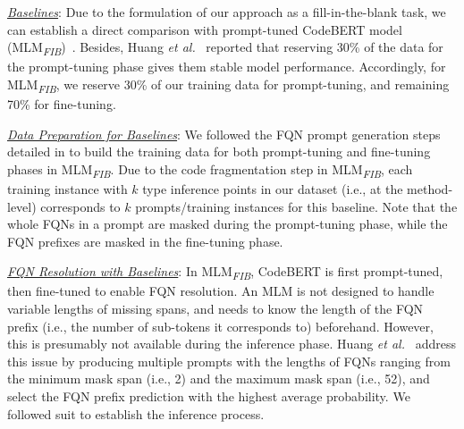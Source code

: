 
\noindent\underline{\textit{Baselines}}: Due to the formulation of our approach as a fill-in-the-blank task, we can establish a direct comparison with prompt-tuned CodeBERT model (MLM\textsubscript{\textit{FIB}})~\cite{prompt-ase22}. Besides, Huang {\em et al.}~\cite{prompt-ase22} reported that reserving 30\% of the data for the prompt-tuning phase gives them stable model performance. Accordingly, for MLM\textsubscript{\textit{FIB}}, we reserve 30\% of our training data for prompt-tuning, and remaining 70\% for fine-tuning.

\noindent\underline{\textit{Data Preparation for Baselines}}: We followed the FQN prompt generation steps detailed in \cite{prompt-ase22} to build the training data for both prompt-tuning and fine-tuning phases in MLM\textsubscript{\textit{FIB}}. Due to the code fragmentation step in MLM\textsubscript{\textit{FIB}}, each training instance with $k$ type inference points in our dataset (i.e., at the method-level) corresponds to $k$ prompts/training instances for this baseline. Note that the whole FQNs in a prompt are masked during the prompt-tuning phase, while the FQN prefixes are masked in the fine-tuning phase.

\noindent\underline{\textit{FQN Resolution with Baselines}}: 
In MLM\textsubscript{\textit{FIB}}, CodeBERT is first prompt-tuned, then fine-tuned to enable FQN resolution. An MLM is not designed to handle variable lengths of missing spans, and needs to know the length of the FQN prefix (i.e., the number of sub-tokens it corresponds to) beforehand. However, this is presumably not available during the inference phase. Huang {\em et al.}~\cite{prompt-ase22} address this issue by producing multiple prompts with the lengths of FQNs ranging from the minimum mask span (i.e., 2) and the maximum mask span (i.e., 52), and select the FQN prefix prediction with the highest average probability. We followed suit to establish the inference process.%

